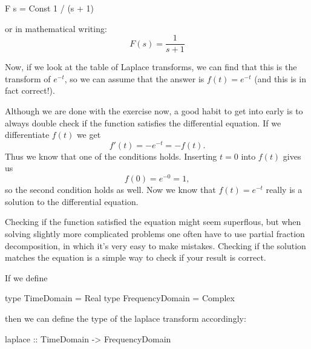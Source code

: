 \begin{example}
\begin{codeeq}
F s = Const 1 / (s + 1)
\end{codeeq} 
or in mathematical writing: 
\begin{equation*} 
    F(s) = \frac{1}{s+1}
\end{equation*} 


Now, if we look at the table of Laplace transforms, we can find that this is the transform of $e^{-t}$, so we can assume that the answer is $f(t) = e^{-t}$ (and this is in fact correct!).

Although we are done with the exercise now, a good habit to get into early is to always double check if the function satisfies the differential equation. If we differentiate $f(t)$ we get
\begin{equation*}
    f'(t) = -e^{-t} = - f(t).
\end{equation*}
Thus we know that one of the conditions holds. Inserting $t=0$ into $f(t)$ gives us 
\begin{equation*}
    f(0) = e^{-0} = 1,
\end{equation*}
so the second condition holds as well. Now we know that $f(t) = e^{-t}$ really is a solution to the differential equation. 

Checking if the function satisfied the equation might seem superflous, but when solving slightly more complicated problems one often have to use partial fraction decomposition, in which it's very easy to make mistakes. Checking if the solution matches the equation is a simple way to check if your result is correct. 

\end{example}




If we define 
\begin{code}
type TimeDomain      = Real
type FrequencyDomain = Complex
\end{code}
then we can define the type of the laplace transform accordingly: 
\begin{code} 
laplace :: TimeDomain -> FrequencyDomain 
\end{code}








